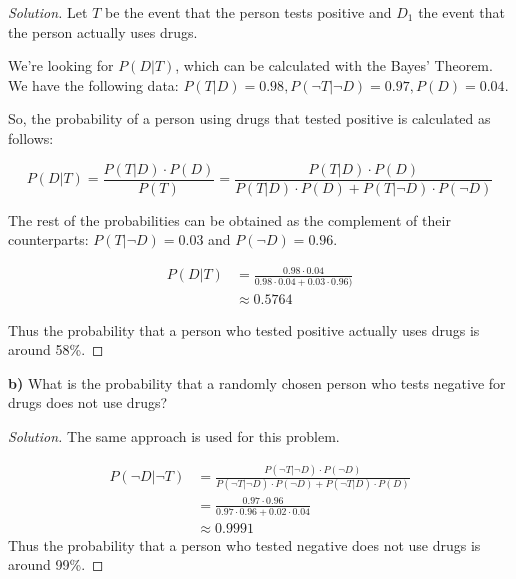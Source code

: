\documentclass[titlepage, letterpaper, fleqn]{article}
\newcommand{\spacepls}{\vspace{5mm}}
\renewcommand\qedsymbol{\(\blacksquare\)}
\newenvironment{solution}
{\renewcommand\qedsymbol{$\square$}\begin{proof}[Solution]}
{\end{proof}}
\begin{document}
\begin{solution}
Let \(T\) be the event that the person tests positive and \(D_1\) the event that the person actually uses drugs.

We're looking for \(P(D|T)\), which can be calculated with the Bayes' Theorem.
We have the following data: \(P(T|D) = 0.98, P(\neg T | \neg D) = 0.97, P(D) = 0.04\).

So, the probability of a person using drugs that tested positive is calculated as follows:

\[P(D|T) = \frac{P(T|D) \cdot P(D)}{P(T)} = \frac{P(T|D) \cdot P(D)}{P(T|D) \cdot P(D) + P(T|\neg D) \cdot P(\neg D)}\]

The rest of the probabilities can be obtained as the complement of their counterparts: \(P(T|\neg D) = 0.03\) and \(P(\neg D) = 0.96\).

\begin{align*}
P(D|T) & =  \frac{0.98 \cdot 0.04}{0.98 \cdot 0.04 + 0.03 \cdot 0.96)}\\
& \approx 0.5764
\end{align*}

Thus the probability that a person who tested positive actually uses drugs is around 58\%.
\end{solution}

\spacepls

{\large \textbf{b)} What is the probability that a randomly chosen person who tests negative for drugs does not use drugs?}

\begin{solution}
The same approach is used for this problem.

\begin{align*}
P(\neg D | \neg T) & = \frac{P(\neg T | \neg D) \cdot P(\neg D)}{P(\neg T | \neg D) \cdot P(\neg D) + P(\neg T | D) \cdot P(D)} \\[2ex]
& = \frac{0.97 \cdot 0.96}{0.97 \cdot 0.96 + 0.02 \cdot 0.04}\\
& \approx 0.9991
\end{align*}
Thus the probability that a person who tested negative does not use drugs is around 99\%.
\end{solution}
\end{document}
